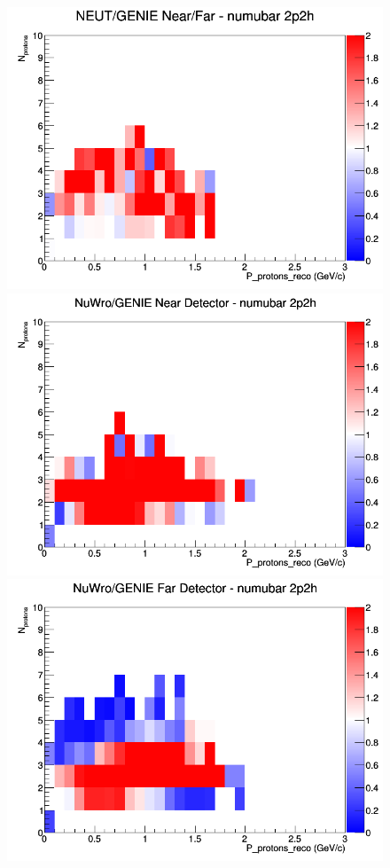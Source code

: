 \documentclass[12pt]{article}
\begin{document}
\begin{figure}[h]
\endminipage
{}
\includegraphics[width=\linewidth]{eff_N_P/FGT/protons/ratios/2p2h_NEUT_GENIE_numubar_NF_N_P.png}
\endminipage
\newline
{}
\includegraphics[width=\linewidth]{eff_N_P/FGT/protons/ratios/2p2h_NuWro_GENIE_numubar_near_N_P.png}
\endminipage
{}
\includegraphics[width=\linewidth]{eff_N_P/FGT/protons/ratios/2p2h_NuWro_GENIE_numubar_far_N_P.png}

\end{figure}
\end{document}
